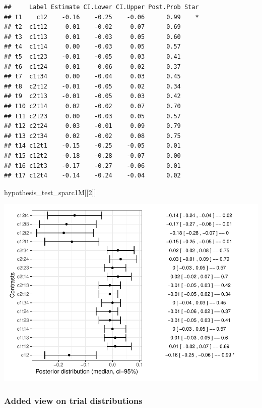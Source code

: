\documentclass[
]{article}
\newenvironment{Shaded}{\begin{snugshade}}{\end{snugshade}}
\newcommand{\DecValTok}[1]{\textcolor[rgb]{0.00,0.00,0.81}{#1}}
\newcommand{\NormalTok}[1]{#1}
\begin{document}
\begin{verbatim}
##     Label Estimate CI.Lower CI.Upper Post.Prob Star
## t1    c12    -0.16    -0.25    -0.06      0.99    *
## t2  c1t12     0.01    -0.02     0.07      0.69     
## t3  c1t13     0.01    -0.03     0.05      0.60     
## t4  c1t14     0.00    -0.03     0.05      0.57     
## t5  c1t23    -0.01    -0.05     0.03      0.41     
## t6  c1t24    -0.01    -0.06     0.02      0.37     
## t7  c1t34     0.00    -0.04     0.03      0.45     
## t8  c2t12    -0.01    -0.05     0.02      0.34     
## t9  c2t13    -0.01    -0.05     0.03      0.42     
## t10 c2t14     0.02    -0.02     0.07      0.70     
## t11 c2t23     0.00    -0.03     0.05      0.57     
## t12 c2t24     0.03    -0.01     0.09      0.79     
## t13 c2t34     0.02    -0.02     0.08      0.75     
## t14 c12t1    -0.15    -0.25    -0.05      0.01     
## t15 c12t2    -0.18    -0.28    -0.07      0.00     
## t16 c12t3    -0.17    -0.27    -0.06      0.01     
## t17 c12t4    -0.14    -0.24    -0.04      0.02
\end{verbatim}

\begin{Shaded}
\begin{Highlighting}[]
\NormalTok{hypothesis\_test\_sparc1M[[}\DecValTok{2}\NormalTok{]]}
\end{Highlighting}
\end{Shaded}

\includegraphics{06_Publish_GUSO_ASIL_files/figure-latex/Contrasts1M-2.pdf}

\hypertarget{added-view-on-trial-distributions}{%
\subsubsection{Added view on trial
distributions}\label{added-view-on-trial-distributions}}
\end{document}
